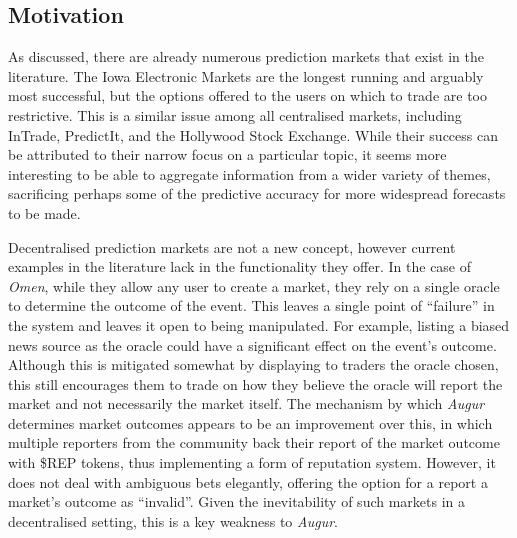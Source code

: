 \subsection{Motivation}

As discussed, there are already numerous prediction markets that exist in the
literature. The Iowa Electronic Markets are the longest running and arguably
most successful, but the options offered to the users on which to trade are too
restrictive. This is a similar issue among all centralised markets, including
InTrade, PredictIt, and the Hollywood Stock Exchange. While their success can
be attributed to their narrow focus on a particular topic, it seems more
interesting to be able to aggregate information from a wider variety of themes,
sacrificing perhaps some of the predictive accuracy for more widespread
forecasts to be made.

Decentralised prediction markets are not a new concept, however current
examples in the literature lack in the functionality they offer. In the case of
\emph{Omen}, while they allow any user to create a market, they rely on a
single oracle to determine the outcome of the event. This leaves a single point
of ``failure'' in the system and leaves it open to being manipulated. For
example, listing a biased news source as the oracle could have a significant
effect on the event's outcome. Although this is mitigated somewhat by
displaying to traders the oracle chosen, this still encourages them to trade on
how they believe the oracle will report the market and not necessarily the
market itself. The mechanism by which \emph{Augur} determines market outcomes
appears to be an improvement over this, in which multiple reporters from the
community back their report of the market outcome with \$REP tokens, thus
implementing a form of reputation system. However, it does not deal with
ambiguous bets elegantly, offering the option for a report a market's
outcome as ``invalid''. Given the inevitability of such markets in a
decentralised setting, this is a key weakness to \emph{Augur}.


